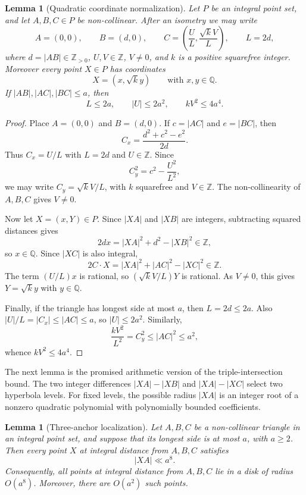 \documentclass[11pt]{article}
\newtheorem{lemma}[theorem]{Lemma}
\newcommand{\ZZ}{\mathbb Z}
\newcommand{\QQ}{\mathbb Q}
\begin{document}
\begin{lemma}[Quadratic coordinate normalization]\label{lem:normalization}
Let \(P\) be an integral point set, and let \(A,B,C\in P\) be non-collinear.
After an isometry we may write
\[
        A=(0,0),\qquad B=(d,0),\qquad
        C=\left(\frac{U}{L},\frac{\sqrt{k}V}{L}\right),
        \qquad L=2d,
\]
where \(d=|AB|\in\ZZ_{>0}\), \(U,V\in\ZZ\), \(V\ne0\), and \(k\) is a positive
squarefree integer.  Moreover every point \(X\in P\) has coordinates
\[
        X=(x,\sqrt{k}y)
        \qquad\text{with }x,y\in\QQ.
\]
If \(|AB|,|AC|,|BC|\le a\), then
\[
        L\le 2a,
        \qquad |U|\le 2a^2,
        \qquad kV^2\le 4a^4.
\]
\end{lemma}

\begin{proof}
Place \(A=(0,0)\) and \(B=(d,0)\).  If \(c=|AC|\) and \(e=|BC|\), then
\[
        C_x=\frac{d^2+c^2-e^2}{2d}.
\]
Thus \(C_x=U/L\) with \(L=2d\) and \(U\in\ZZ\).  Since
\[
        C_y^2=c^2-\frac{U^2}{L^2},
\]
we may write \(C_y=\sqrt{k}V/L\), with \(k\) squarefree and \(V\in\ZZ\).  The
non-collinearity of \(A,B,C\) gives \(V\ne0\).

Now let \(X=(x,Y)\in P\).  Since \(|XA|\) and \(|XB|\) are integers, subtracting
squared distances gives
\[
        2dx=|XA|^2+d^2-|XB|^2\in\ZZ,
\]
so \(x\in\QQ\).  Since \(|XC|\) is also integral,
\[
        2C\cdot X=|XA|^2+|AC|^2-|XC|^2\in\ZZ.
\]
The term \((U/L)x\) is rational, so \((\sqrt{k}V/L)Y\) is rational.  As
\(V\ne0\), this gives \(Y=\sqrt{k}y\) with \(y\in\QQ\).

Finally, if the triangle has longest side at most \(a\), then \(L=2d\le2a\).
Also \(|U|/L=|C_x|\le |AC|\le a\), so \(|U|\le2a^2\).  Similarly,
\[
        \frac{kV^2}{L^2}=C_y^2\le |AC|^2\le a^2,
\]
whence \(kV^2\le4a^4\).
\end{proof}

The next lemma is the promised arithmetic version of the triple-intersection
bound.  The two integer differences
\(|XA|-|XB|\) and \(|XA|-|XC|\) select two hyperbola levels.  For fixed levels,
the possible radius \(|XA|\) is an integer root of a nonzero quadratic
polynomial with polynomially bounded coefficients.

\begin{lemma}[Three-anchor localization]\label{lem:threeanchors}
Let \(A,B,C\) be a non-collinear triangle in an integral point set, and suppose
that its longest side is at most \(a\), with \(a\ge2\).  Then every point \(X\)
at integral distance from \(A,B,C\) satisfies
\[
        |XA|\ll a^8.
\]
Consequently, all points at integral distance from \(A,B,C\) lie in a disk of
radius \(O(a^8)\).  Moreover, there are \(O(a^2)\) such points.
\end{lemma}
\end{document}
